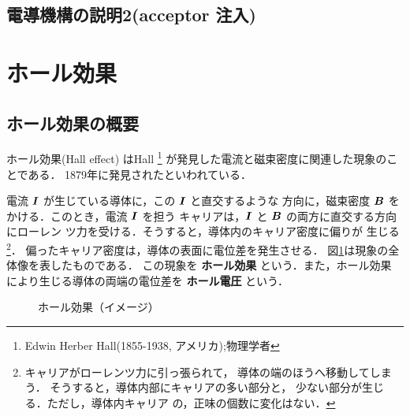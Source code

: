         \subsection{電導機構の説明2(acceptor 注入)}

    \section{ホール効果}
        \subsection{ホール効果の概要}
            ホール効果(Hall effect) はHall
                \footnote{
                    Edwin Herber Hall(1855-1938, アメリカ);物理学者
                }
            が発見した電流と磁束密度に関連した現象のことである．
            1879年に発見されたといわれている．

            電流 $\boldsymbol{I}$ が生じている導体に，この $\boldsymbol{I}$ と直交するような
            方向に，磁束密度 $\boldsymbol{B}$ をかける．このとき，電流 $\boldsymbol{I}$ を担う
            キャリアは，$\boldsymbol{I}$ と $\boldsymbol{B}$ の両方に直交する方向にローレン
            ツ力を受ける．そうすると，導体内のキャリア密度に偏りが
            生じる
                \footnote{
                    キャリアがローレンツ力に引っ張られて，
                    導体の端のほうへ移動してしまう．
                    そうすると，導体内部にキャリアの多い部分と，
                    少ない部分が生じる．ただし，導体内キャリア
                    の，正味の個数に変化はない．
                }．
            偏ったキャリア密度は，導体の表面に電位差を発生させる．
            図\ref{fig:HallEfect1}は現象の全体像を表したものである．
            この現象を \textbf{ホール効果} という．また，ホール効果
            により生じる導体の両端の電位差を \textbf{ホール電圧} という．

                        \begin{figure}[htbp]
                            \begin{center}
                                \caption{ホール効果（イメージ）}
                                \label{fig:HallEfect1}
                            \end{center}
                        \end{figure}

